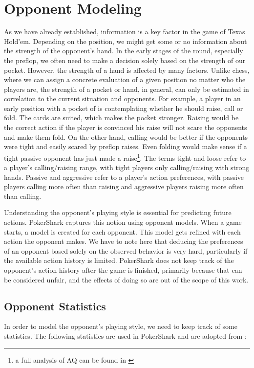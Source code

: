 \section{Opponent Modeling}
\label{sec:opponentModeling}

As we have already established, information is a key factor in the game of Texas Hold'em. Depending on the position, we might get some or no information about the strength of the opponent's hand. In the early stages of the round, especially the preflop, we often need to make a decision solely based on the strength of our pocket. However, the strength of a hand is affected by many factors. Unlike chess, where we can assign a concrete evaluation of a given position no matter who the players are, the strength of a pocket or hand, in general, can only be estimated in correlation to the current situation and opponents. For example, a player in an early position with a pocket of  is contemplating whether he should raise, call or fold. The cards are suited, which makes the pocket stronger. Raising would be the correct action if the player is convinced his raise will not scare the opponents and make them fold. On the other hand, calling would be better if the opponents were tight and easily scared by preflop raises. Even folding would make sense if a tight passive opponent has just made a raise\footnote{a full analysis of AQ can be found in \cite{sklansky_2003}}. The terms tight and loose refer to a player's calling/raising range, with tight players only calling/raising with strong hands. Passive and aggressive refer to a player's action preferences, with passive players calling more often than raising and aggressive players raising more often than calling.

Understanding the opponent's playing style is essential for predicting future actions. PokerShark captures this notion using opponent models. When a game starts, a model is created for each opponent. This model gets refined with each action the opponent makes. We have to note here that deducing the preferences of an opponent based solely on the observed behavior is very hard, particularly if the available action history is limited. PokerShark does not keep track of the opponent's action history after the game is finished, primarily because that can be considered unfair, and the effects of doing so are out of the scope of this work.

\subsection{Opponent Statistics}
In order to model the opponent's playing style, we need to keep track of some statistics. The following statistics are used in PokerShark and are adopted from \cite{johansson2009fish}:

